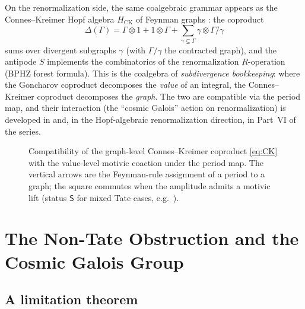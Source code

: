 \documentclass[12pt]{article}
\theoremstyle{definition}
\theoremstyle{remark}
\newcommand{\Mot}{\mathrm{Mot}}
\newcommand{\per}{\mathrm{per}}
\newcommand{\Am}{\mathcal{A}}
\newcommand{\Amm}{\mathcal{A}^{\mathfrak{m}}}
\newcommand{\coA}{\Delta}
\newcommand{\Slab}{\ensuremath{\mathsf{S}}}
\begin{document}
On the renormalization side, the same coalgebraic grammar appears as the Connes--Kreimer Hopf
algebra $H_{\mathrm{CK}}$ of Feynman graphs \cite{ConnesKreimer}: the coproduct
\begin{equation}
\label{eq:CK}
\coA(\Gamma)=\Gamma\otimes 1 + 1\otimes\Gamma + \sum_{\gamma\subsetneq\Gamma}\gamma\otimes
\Gamma/\gamma
\end{equation}
sums over divergent subgraphs $\gamma$ (with $\Gamma/\gamma$ the contracted graph), and the
antipode $S$ implements the combinatorics of the renormalization $R$-operation
(BPHZ forest formula). This is the coalgebra of \emph{subdivergence bookkeeping}: where the
Goncharov coproduct decomposes the \emph{value} of an integral, the Connes--Kreimer coproduct
decomposes the \emph{graph}. The two are compatible via the period map, and their interaction
(the ``cosmic Galois'' action on renormalization) is developed in 
and, in the Hopf-algebraic renormalization direction, in Part~VI of the series.

\begin{figure}[ht]
\centering
{}
\caption{Compatibility of the graph-level Connes--Kreimer coproduct \eqref{eq:CK} with the
value-level motivic coaction under the period map. The vertical arrows are the Feynman-rule
assignment of a period to a graph; the square commutes when the amplitude admits a motivic
lift (status \Slab{} for mixed Tate cases, e.g.\ \cite{PanzerSchnetz}).}
\label{fig:CK}
\end{figure}

\section{The Non-Tate Obstruction and the Cosmic Galois Group}
\label{sec:nontate}

\subsection{A limitation theorem}
\end{document}
